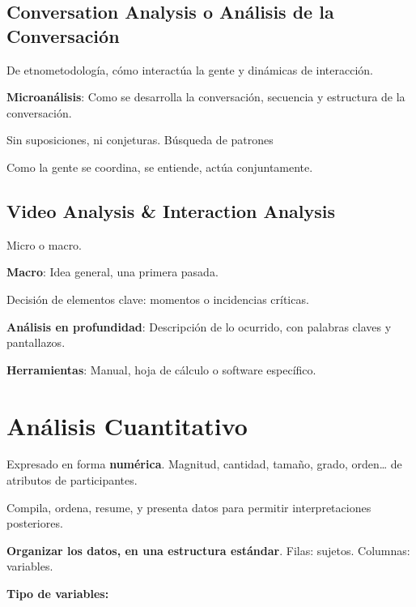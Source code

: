 \documentclass[12pt]{report} %
\begin{document}
\subsection{Conversation Analysis o Análisis de la
Conversación}

De etnometodología, cómo interactúa la gente y dinámicas de interacción.

\textbf{Microanálisis}: Como se desarrolla la conversación, secuencia y
estructura de la conversación.

Sin suposiciones, ni conjeturas. Búsqueda de patrones

Como la gente se coordina, se entiende, actúa conjuntamente.

\subsection{Video Analysis \& Interaction
Analysis}

Micro o macro.

\textbf{Macro}: Idea general, una primera pasada.

Decisión de elementos clave: momentos o incidencias críticas.

\textbf{Análisis en profundidad}: Descripción de lo ocurrido, con
palabras claves y pantallazos.

\textbf{Herramientas}: Manual, hoja de cálculo o software específico.

\section{Análisis Cuantitativo}

Expresado en forma \textbf{numérica}. Magnitud, cantidad, tamaño, grado,
orden\ldots{} de atributos de participantes.

Compila, ordena, resume, y presenta datos para permitir interpretaciones
posteriores.

\textbf{Organizar los datos, en una estructura estándar}. Filas: sujetos. Columnas: variables.

\textbf{Tipo de variables:}
\end{document}
